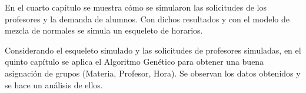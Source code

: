 En el cuarto capítulo se muestra cómo se simularon las solicitudes de los profesores y la demanda de alumnos. Con dichos resultados y con el modelo de mezcla de normales se simula un esqueleto de horarios.

Considerando el esqueleto simulado y las solicitudes de profesores simuladas, en el quinto capítulo se aplica el Algoritmo Genético para obtener una buena asignación de grupos (Materia, Profesor, Hora). Se observan los datos obtenidos y se hace un análisis de ellos. %




